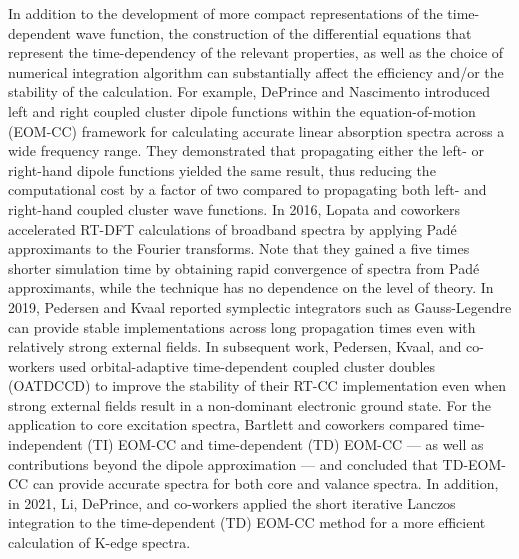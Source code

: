 In addition to the development of more compact representations of the
time-dependent wave function, the construction of the differential equations
that represent the time-dependency of the relevant properties, as well as the
choice of numerical integration algorithm can substantially affect the
efficiency and/or the stability of the calculation.  For example, DePrince and
Nascimento\cite{Nascimento2016,Nascimento2017} introduced left and right coupled
cluster dipole functions within the equation-of-motion (EOM-CC) framework for
calculating accurate linear absorption spectra across a wide frequency range.
They demonstrated that propagating either the left- or right-hand dipole
functions yielded the same result, thus reducing the computational cost by a
factor of two compared to propagating both left- and right-hand coupled cluster
wave functions. In 2016, Lopata\cite{Bruner2016} and coworkers accelerated
RT-DFT calculations of broadband spectra by applying Pad{\'e} approximants to
the Fourier transforms. Note that they gained a five times shorter simulation
time by obtaining rapid convergence of spectra from Pad{\'e} approximants,
while the technique has no dependence on the level of theory. In 2019, Pedersen and
Kvaal\cite{Pedersen2019} reported symplectic integrators such as Gauss-Legendre
can provide stable implementations across long propagation times even with
relatively strong external fields. In subsequent work, Pedersen, Kvaal, and
co-workers\cite{Kristiansen2020} used orbital-adaptive time-dependent coupled
cluster doubles (OATDCCD) to improve the stability of their RT-CC
implementation even when strong external fields result in a non-dominant
electronic ground state. For the application to core
excitation spectra, Bartlett and coworkers\cite{Park2019,Park2021}
compared time-independent (TI) EOM-CC and time-dependent (TD) EOM-CC --- as
well as contributions beyond the dipole approximation --- and concluded that
TD-EOM-CC can provide accurate spectra for both core and valance spectra. In
addition, in 2021, Li, DePrince, and co-workers\cite{Cooper2021} applied the short
iterative Lanczos integration to the time-dependent (TD) EOM-CC method for a
more efficient calculation of K-edge spectra. 

